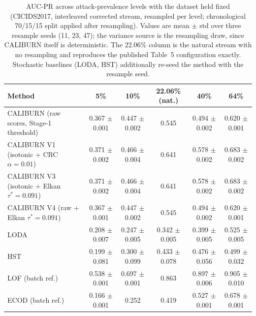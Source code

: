\begin{table}[t]
\centering
\small
\begin{tabular}{lccccc}
\toprule
Method & 5\% & 10\% & 22.06\% (nat.) & 40\% & 64\% \\
\midrule
CALIBURN (raw scores, Stage-1 threshold) & 0.367 $\pm$ 0.001 & 0.447 $\pm$ 0.002 & 0.545 & 0.494 $\pm$ 0.002 & 0.620 $\pm$ 0.001 \\
CALIBURN V1 (isotonic + CRC $\alpha{=}0.01$) & 0.371 $\pm$ 0.002 & 0.466 $\pm$ 0.004 & 0.641 & 0.578 $\pm$ 0.002 & 0.683 $\pm$ 0.002 \\
CALIBURN V3 (isotonic + Elkan $\tau^*{=}0.091$) & 0.371 $\pm$ 0.002 & 0.466 $\pm$ 0.004 & 0.641 & 0.578 $\pm$ 0.002 & 0.683 $\pm$ 0.002 \\
CALIBURN V4 (raw + Elkan $\tau^*{=}0.091$) & 0.367 $\pm$ 0.001 & 0.447 $\pm$ 0.002 & 0.545 & 0.494 $\pm$ 0.002 & 0.620 $\pm$ 0.001 \\
LODA & 0.208 $\pm$ 0.007 & 0.247 $\pm$ 0.005 & 0.342 $\pm$ 0.005 & 0.399 $\pm$ 0.005 & 0.525 $\pm$ 0.005 \\
HST & 0.199 $\pm$ 0.081 & 0.300 $\pm$ 0.099 & 0.433 $\pm$ 0.078 & 0.476 $\pm$ 0.056 & 0.499 $\pm$ 0.032 \\
LOF (batch ref.) & 0.538 $\pm$ 0.001 & 0.697 $\pm$ 0.001 & 0.863 & 0.897 $\pm$ 0.006 & 0.905 $\pm$ 0.010 \\
ECOD (batch ref.) & 0.166 $\pm$ 0.001 & 0.252 & 0.419 & 0.527 $\pm$ 0.001 & 0.678 $\pm$ 0.001 \\
\bottomrule
\end{tabular}
\caption{AUC-PR across attack-prevalence levels with the dataset held fixed (CICIDS2017, interleaved corrected stream, resampled per level; chronological 70/15/15 split applied after resampling). Values are mean $\pm$ std over three resample seeds (11, 23, 47); the variance source is the resampling draw, since CALIBURN itself is deterministic. The 22.06\% column is the natural stream with no resampling and reproduces the published Table~5 configuration exactly. Stochastic baselines (LODA, HST) additionally re-seed the method with the resample seed.}
\label{tab:prevalence-sweep}
\end{table}
